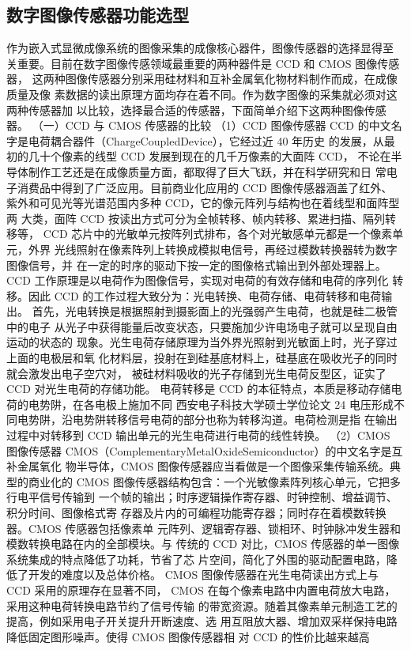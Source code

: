 \subsection{数字图像传感器功能选型}
作为嵌入式显微成像系统的图像采集的成像核心器件，图像传感器的选择显得至 关重要。目前在数字图像传感领域最重要的两种器件是 CCD 和 CMOS 图像传感器， 这两种图像传感器分别采用硅材料和互补金属氧化物材料制作而成，在成像质量及像 素数据的读出原理方面均存在着不同。作为数字图像的采集就必须对这两种传感器加 以比较，选择最合适的传感器，下面简单介绍下这两种图像传感器。 （一）CCD 与 CMOS 传感器的比较 （1）CCD 图像传感器 CCD 的中文名字是电荷耦合器件（ChargeCoupledDevice），它经过近 40 年历史 的发展，从最初的几十个像素的线型 CCD 发展到现在的几千万像素的大面阵 CCD， 不论在半导体制作工艺还是在成像质量方面，都取得了巨大飞跃，并在科学研究和日 常电子消费品中得到了广泛应用。目前商业化应用的 CCD 图像传感器涵盖了红外、 紫外和可见光等光谱范围内多种 CCD，它的像元阵列与结构也在着线型和面阵型两 大类，面阵 CCD 按读出方式可分为全帧转移、帧内转移、累进扫描、隔列转移等， CCD 芯片中的光敏单元按阵列式排布，各个对光敏感单元都是一个像素单元，外界 光线照射在像素阵列上转换成模拟电信号，再经过模数转换器转为数字图像信号，并 在一定的时序的驱动下按一定的图像格式输出到外部处理器上。 CCD 工作原理是以电荷作为图像信号，实现对电荷的有效存储和电荷的序列化 转移。因此 CCD 的工作过程大致分为：光电转换、电荷存储、电荷转移和电荷输出。 首先，光电转换是根据照射到摄影面上的光强弱产生电荷，也就是硅二极管中的电子 从光子中获得能量后改变状态，只要施加少许电场电子就可以呈现自由运动的状态的 现象。光生电荷存储原理为当外界光照射到光敏面上时，光子穿过上面的电极层和氧 化材料层，投射在到硅基底材料上，硅基底在吸收光子的同时就会激发出电子空穴对， 被硅材料吸收的光子存储到光生电荷反型区，证实了 CCD 对光生电荷的存储功能。 电荷转移是 CCD 的本征特点，本质是移动存储电荷的电势阱，在各电极上施加不同
西安电子科技大学硕士学位论文
24
电压形成不同电势阱，沿电势阱转移信号电荷的部分也称为转移沟道。电荷检测是指 在输出过程中对转移到 CCD 输出单元的光生电荷进行电荷的线性转换。 （2）CMOS 图像传感器 CMOS（ComplementaryMetalOxideSemiconductor）的中文名字是互补金属氧化 物半导体，CMOS 图像传感器应当看做是一个图像采集传输系统。典型的商业化的 CMOS 图像传感器结构包含：一个光敏像素阵列核心单元，它把多行电平信号传输到 一个帧的输出；时序逻辑操作寄存器、时钟控制、增益调节、积分时间、图像格式寄 存器及片内的可编程功能寄存器；同时存在着模数转换器。CMOS 传感器包括像素单 元阵列、逻辑寄存器、锁相环、时钟脉冲发生器和模数转换电路在内的全部模块。与 传统的 CCD 对比，CMOS 传感器的单一图像系统集成的特点降低了功耗，节省了芯 片空间，简化了外围的驱动配置电路，降低了开发的难度以及总体价格。 CMOS 图像传感器在光生电荷读出方式上与 CCD 采用的原理存在显著不同， CMOS 在每个像素电路中内置电荷放大电路，采用这种电荷转换电路节约了信号传输 的带宽资源。随着其像素单元制造工艺的提高，例如采用电子开关提升开断速度、选 用互阻放大器、增加双采样保持电路降低固定图形噪声。使得 CMOS 图像传感器相 对 CCD 的性价比越来越高
